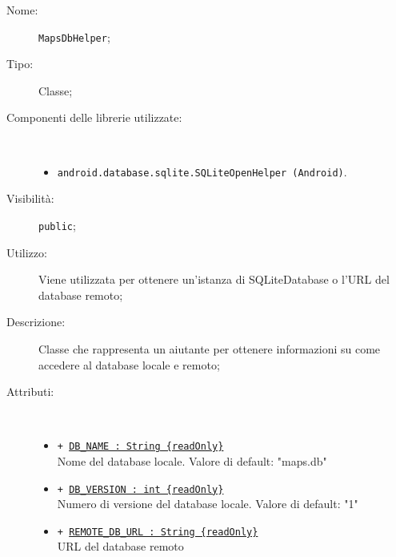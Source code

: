 \documentclass[../DefinizioneDiProdotto.tex]{subfiles}
\begin{document}
\begin{description}
	\item[Nome:] \texttt{MapsDbHelper};
	\item[Tipo:] Classe;
	\item[Componenti delle librerie utilizzate:] \
	\begin{itemize}
		\item \texttt{android.database.sqlite.SQLiteOpenHelper (Android)}.
		
	\end{itemize}
	\item[Visibilità:] \texttt{public};
	\item[Utilizzo:] Viene utilizzata per ottenere un'istanza di SQLiteDatabase o l'URL del database remoto;
	\item[Descrizione:] Classe che rappresenta un aiutante per ottenere informazioni su come accedere al database locale e remoto;
	\item[Attributi:] \
	\begin{itemize}
		\item \texttt{+ \underline{DB\_NAME : String \{readOnly\}}}\\
		Nome del database locale. Valore di default: "maps.db"
		
		\item \texttt{+ \underline{DB\_VERSION : int \{readOnly\}}}\\
		Numero di versione del database locale. Valore di default: "1"
		
		\item \texttt{+ \underline{REMOTE\_DB\_URL : String \{readOnly\}}}\\
		URL del database remoto
		

\end{itemize}
\end{description}
\end{document}
